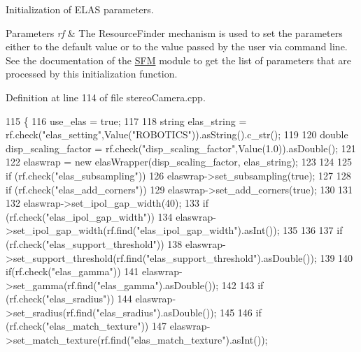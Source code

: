Initialization of E\+L\+AS parameters. 


\begin{DoxyParams}{Parameters}
{\em rf} & The Resource\+Finder mechanism is used to set the parameters either to the default value or to the value passed by the user via command line. See the documentation of the \hyperlink{group__SFM}{S\+FM} module to get the list of parameters that are processed by this initialization function. \\
\hline
\end{DoxyParams}


Definition at line 114 of file stereo\+Camera.\+cpp.


\begin{DoxyCode}
115 \{
116     use\_elas = \textcolor{keyword}{true};
117 
118     \textcolor{keywordtype}{string} elas\_string = rf.check(\textcolor{stringliteral}{"elas\_setting"},Value(\textcolor{stringliteral}{"ROBOTICS"})).asString().c\_str();
119 
120     \textcolor{keywordtype}{double} disp\_scaling\_factor = rf.check(\textcolor{stringliteral}{"disp\_scaling\_factor"},Value(1.0)).asDouble();
121 
122     elaswrap = \textcolor{keyword}{new} elasWrapper(disp\_scaling\_factor, elas\_string);
123 
124 
125     \textcolor{keywordflow}{if} (rf.check(\textcolor{stringliteral}{"elas\_subsampling"}))
126         elaswrap->set\_subsampling(\textcolor{keyword}{true});
127 
128     \textcolor{keywordflow}{if} (rf.check(\textcolor{stringliteral}{"elas\_add\_corners"}))
129         elaswrap->set\_add\_corners(\textcolor{keyword}{true});
130 
131 
132     elaswrap->set\_ipol\_gap\_width(40);
133     \textcolor{keywordflow}{if} (rf.check(\textcolor{stringliteral}{"elas\_ipol\_gap\_width"}))
134         elaswrap->set\_ipol\_gap\_width(rf.find(\textcolor{stringliteral}{"elas\_ipol\_gap\_width"}).asInt());
135 
136 
137     \textcolor{keywordflow}{if} (rf.check(\textcolor{stringliteral}{"elas\_support\_threshold"}))
138         elaswrap->set\_support\_threshold(rf.find(\textcolor{stringliteral}{"elas\_support\_threshold"}).asDouble());
139 
140     \textcolor{keywordflow}{if}(rf.check(\textcolor{stringliteral}{"elas\_gamma"}))
141         elaswrap->set\_gamma(rf.find(\textcolor{stringliteral}{"elas\_gamma"}).asDouble());
142 
143     \textcolor{keywordflow}{if} (rf.check(\textcolor{stringliteral}{"elas\_sradius"}))
144         elaswrap->set\_sradius(rf.find(\textcolor{stringliteral}{"elas\_sradius"}).asDouble());
145 
146     \textcolor{keywordflow}{if} (rf.check(\textcolor{stringliteral}{"elas\_match\_texture"}))
147         elaswrap->set\_match\_texture(rf.find(\textcolor{stringliteral}{"elas\_match\_texture"}).asInt());

\end{DoxyCode}
